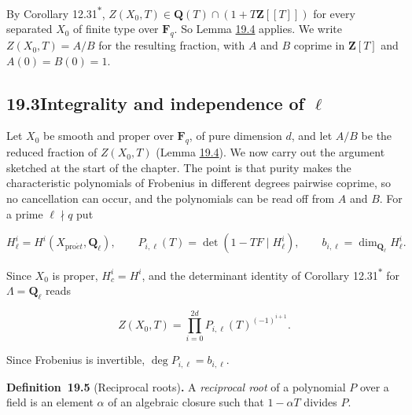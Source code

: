 \documentclass[11pt]{article}
\newenvironment{bpstatement}[2]{\par\addvspace{0.6\baselineskip}\noindent\textbf{#1}#2\textbf{.}\enspace\ignorespaces}
  {\par\addvspace{0.4\baselineskip}}
\newcommand{\bpout}[1]{#1\textsuperscript{\hyperlink{bp-outside}{\ensuremath{\ast}}}}
\begin{document}
\label{bp335}%
By Corollary \bpout{12.31}, \(Z(X_0,T)\in\mathbf Q(T)\cap(1+T\mathbf Z[[T]])\) for every separated \(X_0\) of finite type over \(\mathbf F_q\). So Lemma \hyperref[bp333]{19.4} applies. We write \(Z(X_0,T)=A/B\) for the resulting fraction, with \(A\) and \(B\) coprime in \(\mathbf Z[T]\) and \(A(0)=B(0)=1\).


\subsection*{\texorpdfstring{19.3\quad Integrality and independence of $\ell$}{19.3 Integrality and independence of ell}}
\label{bp336}%
\label{bp337}%
Let \(X_0\) be smooth and proper over \(\mathbf F_q\), of pure dimension \(d\), and let \(A/B\) be the reduced fraction of \(Z(X_0,T)\) (Lemma \hyperref[bp333]{19.4}). We now carry out the argument sketched at the start of the chapter. The point is that purity makes the characteristic polynomials of Frobenius in different degrees pairwise coprime, so no cancellation can occur, and the polynomials can be read off from \(A\) and \(B\). For a prime \(\ell\nmid q\) put

\[
H^i_\ell=H^i(X_{\mathrm{pro}\acute{e}t},\mathbf Q_\ell),\qquad
P_{i,\ell}(T)=\det(1-TF\mid H^i_\ell),\qquad
b_{i,\ell}=\dim_{\mathbf Q_\ell}H^i_\ell.
\]

Since \(X_0\) is proper, \(H^i_c=H^i\), and the determinant identity of Corollary \bpout{12.31} for \(\Lambda=\mathbf Q_\ell\) reads

\[
Z(X_0,T)=\prod_{i=0}^{2d}P_{i,\ell}(T)^{(-1)^{i+1}}.
\tag{19.1}
\]

Since Frobenius is invertible, \(\deg P_{i,\ell}=b_{i,\ell}\).

\label{bp338}%
\begin{bpstatement}{Definition~19.5}{ (Reciprocal roots)}
A \emph{reciprocal root} of a polynomial \(P\) over a field is an element \(\alpha\) of an algebraic closure such that \(1-\alpha T\) divides \(P\).
\end{bpstatement}
\end{document}
